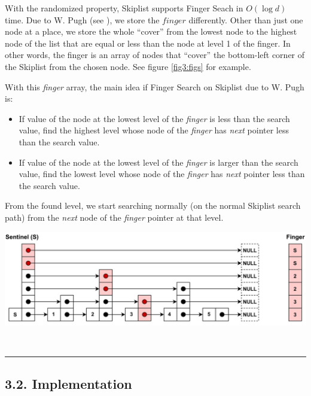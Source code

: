 \documentclass[12pt,english,]{article}
\providecommand{\tightlist}{%
  \setlength{\itemsep}{0pt}\setlength{\parskip}{0pt}}
\let\origfigure\figure
\let\endorigfigure\endfigure
\renewenvironment{figure}[1][2] {
    \expandafter\origfigure\expandafter[H]
} {
    \endorigfigure
}
\begin{document}
With the randomized property, Skiplist supports Finger Seach in
\(O(\log d)\) time. Due to W. Pugh (see \cite{2}), we store the
\(finger\) differently. Other than just one node at a place, we store
the whole ``cover'' from the lowest node to the highest node of the list
that are equal or less than the node at level 1 of the finger. In other
words, the finger is an array of nodes that ``cover'' the bottom-left
corner of the Skiplist from the chosen node. See figure \ref{fig3:figs}
for example.

With this \emph{finger} array, the main idea if Finger Search on
Skiplist due to W. Pugh is: \vspace{-2.5mm}

\begin{itemize}
\tightlist
\item
  If value of the node at the lowest level of the \emph{finger} is less
  than the search value, find the highest level whose node of the
  \emph{finger} has \emph{next} pointer less than the search value.
\item
  If value of the node at the lowest level of the \emph{finger} is
  larger than the search value, find the lowest level whose node of the
  \emph{finger} has \emph{next} pointer less than the search value.
\end{itemize}

From the found level, we start searching normally (on the normal
Skiplist search path) from the \emph{next} node of the \emph{finger}
pointer at that level.

\begin{figure}
\centering
\vspace{1mm}
\includegraphics[height=0.3\textwidth]{Skiplist.png}
\caption{\label{fig3:figs}Visualization of a \emph{finger} on a Skiplist. In this example, finger is an array of all nodes cover the bottom-left corner of the Skiplist from node 3.}

\  
\hrule
\end{figure}

\hypertarget{implementation-1}{%
\subsection{3.2. Implementation}\label{implementation-1}}
\end{document}
